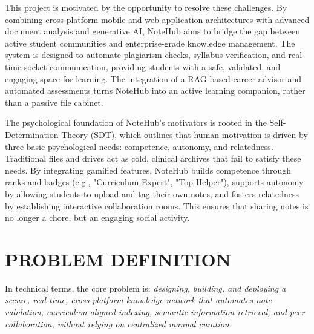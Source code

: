 \documentclass[12,Times new Roman,a4paper]{report}
\begin{document}
This project is motivated by the opportunity to resolve these challenges. By combining cross-platform mobile and web application architectures with advanced document analysis and generative AI, NoteHub aims to bridge the gap between active student communities and enterprise-grade knowledge management. The system is designed to automate plagiarism checks, syllabus verification, and real-time socket communication, providing students with a safe, validated, and engaging space for learning. The integration of a RAG-based career advisor and automated assessments turns NoteHub into an active learning companion, rather than a passive file cabinet.

The psychological foundation of NoteHub's motivators is rooted in the Self-Determination Theory (SDT), which outlines that human motivation is driven by three basic psychological needs: competence, autonomy, and relatedness. Traditional files and drives act as cold, clinical archives that fail to satisfy these needs. By integrating gamified features, NoteHub builds competence through ranks and badges (e.g., "Curriculum Expert", "Top Helper"), supports autonomy by allowing students to upload and tag their own notes, and fosters relatedness by establishing interactive collaboration rooms. This ensures that sharing notes is no longer a chore, but an engaging social activity.

\section{PROBLEM DEFINITION}

In technical terms, the core problem is: \textit{designing, building, and deploying a secure, real-time, cross-platform knowledge network that automates note validation, curriculum-aligned indexing, semantic information retrieval, and peer collaboration, without relying on centralized manual curation.}
\end{document}
